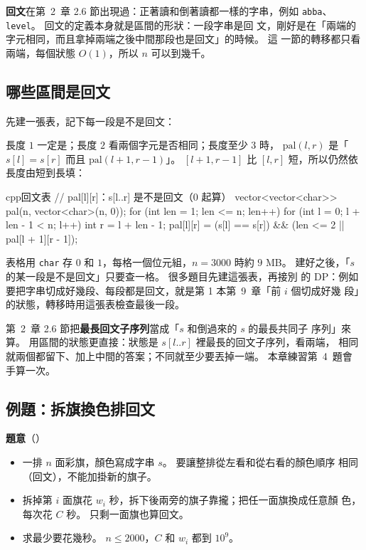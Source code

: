 \textbf{回文}在第~2~章 2.6 節出現過：正著讀和倒著讀都一樣的字串，例如
\texttt{abba}、\texttt{level}。 回文的定義本身就是區間的形狀：一段字串是回
文，剛好是在「兩端的字元相同，而且拿掉兩端之後中間那段也是回文」的時候。 這
一節的轉移都只看兩端，每個狀態 $O(1)$，所以 $n$ 可以到幾千。

\subsection{哪些區間是回文}

先建一張表，記下每一段是不是回文：

\begin{center}
\end{center}

長度 $1$ 一定是；長度 $2$ 看兩個字元是否相同；長度至少 $3$ 時，
$\mathrm{pal}(l, r)$ 是「$s[l] = s[r]$ 而且 $\mathrm{pal}(l + 1, r - 1)$」。
$[l + 1, r - 1]$ 比 $[l, r]$ 短，所以仍然依長度由短到長填：

\begin{code}{cpp}{回文表}
// pal[l][r]：s[l..r] 是不是回文（0 起算）
vector<vector<char>> pal(n, vector<char>(n, 0));
for (int len = 1; len <= n; len++) {
    for (int l = 0; l + len - 1 < n; l++) {
        int r = l + len - 1;
        pal[l][r] = (s[l] == s[r]) && (len <= 2 || pal[l + 1][r - 1]);
    }
}
\end{code}

表格用 \texttt{char} 存 $0$ 和 $1$，每格一個位元組，$n = 3000$ 時約 $9$ MB。
建好之後，「$s$ 的某一段是不是回文」只要查一格。 很多題目先建這張表，再接別
的 DP：例如要把字串切成好幾段、每段都是回文，就是第 1 本第~9~章「前 $i$ 個切成好幾
段」的狀態，轉移時用這張表檢查最後一段。

第~2~章 2.6 節把\textbf{最長回文子序列}當成「$s$ 和倒過來的 $s$ 的最長共同子
序列」來算。 用區間的狀態更直接：狀態是 $s[l..r]$ 裡最長的回文子序列，看兩端，
相同就兩個都留下、加上中間的答案；不同就至少要丟掉一端。 本章練習第~4~題會
手算一次。

\subsection{例題：拆旗換色排回文}
\label{sec:ex-ivdp-flags}

\textbf{題意}（）

\begin{itemize}
\item 一排 $n$ 面彩旗，顏色寫成字串 $s$。 要讓整排從左看和從右看的顏色順序
相同（回文），不能加掛新的旗子。
\item 拆掉第 $i$ 面旗花 $w_i$ 秒，拆下後兩旁的旗子靠攏；把任一面旗換成任意顏
色，每次花 $C$ 秒。 只剩一面旗也算回文。
\item 求最少要花幾秒。 $n \le 2000$，$C$ 和 $w_i$ 都到 $10^9$。
\end{itemize}

